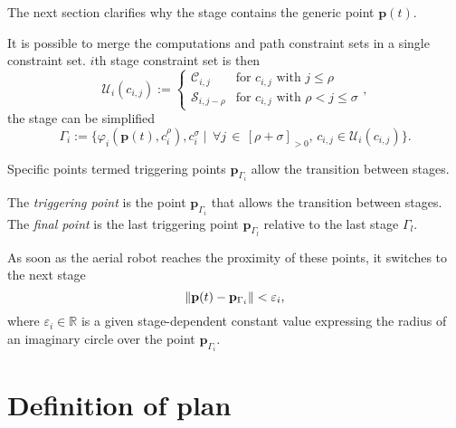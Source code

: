 The next section clarifies why the stage contains the generic point $\mathbf{p}(t)$.

It is possible to merge the computations and path constraint sets in a single constraint set. $i$th stage constraint set is then
\begin{equation}\label{eq:constraint-set}
  \mathcal{U}_i(c_{i,j}):=\begin{cases}
  \mathcal{C}_{i,j} & \text{for } c_{i,j} \text{ with } j\leq\rho\\
  \mathcal{S}_{i,j-\rho} & \text{for } c_{i,j} \text{ with } \rho<j\leq\sigma
\end{cases},\end{equation}
the stage can be simplified 
\begin{equation}
  \Gamma_i:=\{\varphi_i(\mathbf{p}(t),c_i^\rho),c_i^\sigma\mid \,\forall j\,\in\,[\rho+\sigma]_{>0},\,c_{i,j}\in\mathcal{U}_i(c_{i,j})\}.
\end{equation}

Specific points termed triggering points $\mathbf{p}_{\Gamma_i}$ allow the transition between stages.

\begin{defn}
  \label{def:trigs}
  The \emph{triggering point} is the point $\mathbf{p}_{\Gamma_{i}}$ that allows the transition between stages. The \emph{final point} is the last triggering point $\mathbf{p}_{\Gamma_{l}}$ relative to the last stage $\Gamma_l$.
\end{defn}

As soon as the aerial robot reaches the proximity of these points, it switches to the next stage
\begin{equation}\label{eq:trig-vareps}
  \left\lVert\mathbf{p}(t)-\mathbf{p}_{\Gamma_i}\right\rVert<\varepsilon_i,
\end{equation}
where $\varepsilon_i\in\mathbb{R}$ is a given stage-dependent constant value expressing the radius of an imaginary circle over the point $\mathbf{p}_{\Gamma_i}$.


\section{Definition of plan}
\label{sec:plan}

